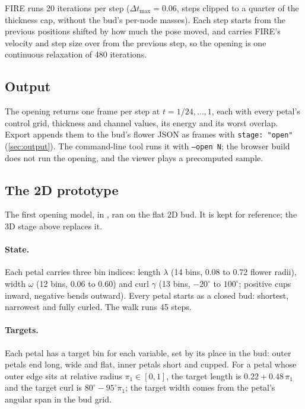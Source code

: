 FIRE runs 20 iterations per step ($\Delta t_{\max} = 0.06$, steps clipped to a
quarter of the thickness cap, without the bud's per-node masses). Each step
starts from the previous positions shifted by how much the pose moved, and
carries FIRE's velocity and step size over from the previous step, so the
opening is one continuous relaxation of 480 iterations.

\subsection{Output}
The opening returns one frame per step at $t = 1/24, \dots, 1$, each with
every petal's control grid, thickness and channel values, its energy and its
worst overlap. Export appends them to the bud's flower JSON as frames with
\texttt{stage: "open"} (\cref{sec:output}). The command-line tool runs it with
\texttt{--open N}; the browser build does not run the opening, and the viewer
plays a precomputed sample.

\subsection{The 2D prototype}
The first opening model, in ,
ran on the flat 2D bud. It is kept for reference; the 3D stage above replaces
it.

\paragraph{State.} Each petal carries three bin indices: length $\lambda$ (14 bins,
0.08 to 0.72 flower radii), width $\omega$ (12 bins, 0.06 to 0.60) and curl
$\gamma$ (13 bins, $-20^\circ$ to $100^\circ$; positive cups inward, negative
bends outward). Every petal starts as a closed bud: shortest, narrowest and
fully curled. The walk runs 45 steps.

\paragraph{Targets.} Each petal has a target bin for each variable, set by its
place in the bud: outer petals end long, wide and flat, inner petals short and
cupped. For a petal whose outer edge sits at relative radius $\pi_1\in[0,1]$,
the target length is $0.22 + 0.48\,\pi_1$ and the target curl is
$80^\circ - 95^\circ\pi_1$; the target width comes from the petal's angular span
in the bud grid.

